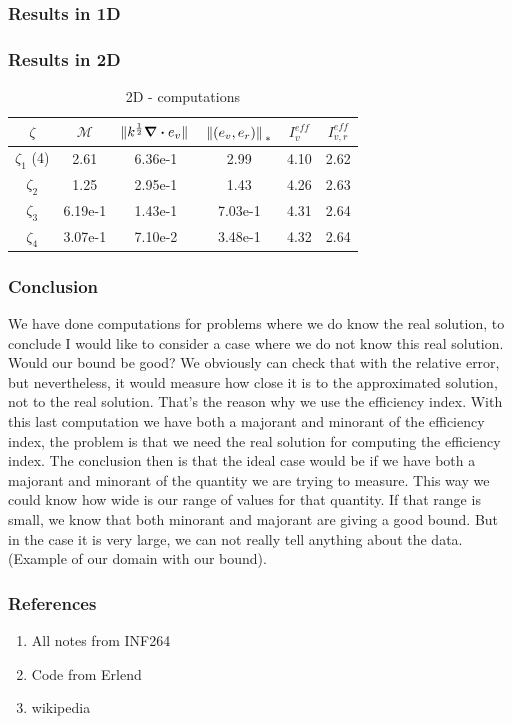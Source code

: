 \documentclass[t]{beamer}
\begin{document}
    \begin{frame}
        \frametitle{Results in 1D}
    
    \end{frame}

    \begin{frame}[c]
        \frametitle{Results in 2D}
        \begin{table}[c]
              \begin{tabular}{c | c | c | c | c | c } 
                $\zeta$ & $\mathcal{M}$  & $\norm*{k^{\frac{1}{2}}\div e_v}$ & $\norm*{(e_v,e_r)}_{*}$ & $I_v^{eff}$ & $I_{v,r}^{eff}$ \\
                \hline \hline
                $\zeta_1$ (4) & 2.61 & 6.36e-1 & 2.99 & 4.10 & 2.62 \\ 
                $\zeta_2$ & 1.25 & 2.95e-1 & 1.43 & 4.26 & 2.63 \\
                $\zeta_3$ & 6.19e-1 & 1.43e-1& 7.03e-1 & 4.31 & 2.64 \\
                $\zeta_4$ & 3.07e-1 & 7.10e-2 & 3.48e-1 & 4.32 & 2.64 \\
              \end{tabular}
              \caption{2D - computations}
          \end{table}
    
    \end{frame}

    \begin{frame}

    \frametitle{Conclusion}
        We have done computations for problems where we do know the real solution, to conclude I would like to consider a case where we do not know this real solution. Would our bound be good? We obviously can check that with the relative error, but nevertheless, it would measure how close it is to the approximated solution, not to the real solution. That's the reason why we use the efficiency index. With this last computation we have both a majorant and minorant of the efficiency index, the problem is that we need the real solution for computing the efficiency index. The conclusion then is that the ideal case would be if we have both a majorant and minorant of the quantity we are trying to measure. This way we could know how wide is our range of values for that quantity. If that range is small, we know that both minorant and majorant are giving a good bound. But in the case it is very large, we can not really tell anything about the data. (Example of our domain with our bound).
    \end{frame}

    \begin{frame}
    \frametitle{References}
        \begin{enumerate}
            \item All notes from INF264
            \item Code from Erlend 
            \item wikipedia
        \end{enumerate}
    \end{frame}
\end{document}
